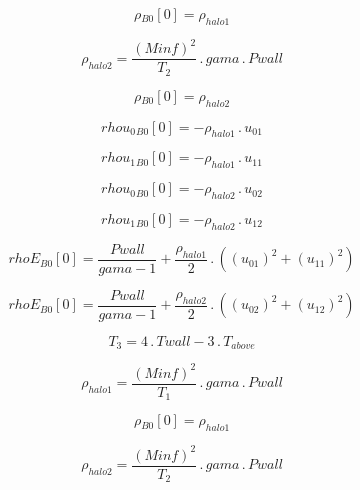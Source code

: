 \documentclass{article}
\begin{document}
\begin{dmath}{\rho{_{B0}}}[{0}] = \rho_{halo 1}\end{dmath}

\begin{dmath}\rho_{halo 2} = \frac{\left(Minf \right)^{2}}{T_{2}} \,.\, gama \,.\, Pwall\end{dmath}

\begin{dmath}{\rho{_{B0}}}[{0}] = \rho_{halo 2}\end{dmath}

\begin{dmath}{rhou_{0}{_{B0}}}[{0}] = - \rho_{halo 1} \,.\, u_{01}\end{dmath}

\begin{dmath}{rhou_{1}{_{B0}}}[{0}] = - \rho_{halo 1} \,.\, u_{11}\end{dmath}

\begin{dmath}{rhou_{0}{_{B0}}}[{0}] = - \rho_{halo 2} \,.\, u_{02}\end{dmath}

\begin{dmath}{rhou_{1}{_{B0}}}[{0}] = - \rho_{halo 2} \,.\, u_{12}\end{dmath}

\begin{dmath}{rhoE{_{B0}}}[{0}] = \frac{Pwall}{gama - 1} + \frac{\rho_{halo 1}}{2} \,.\, \left(\left(u_{01} \right)^{2} + \left(u_{11} \right)^{2}\right)\end{dmath}

\begin{dmath}{rhoE{_{B0}}}[{0}] = \frac{Pwall}{gama - 1} + \frac{\rho_{halo 2}}{2} \,.\, \left(\left(u_{02} \right)^{2} + \left(u_{12} \right)^{2}\right)\end{dmath}

\begin{dmath}T_{3} = 4 \,.\, Twall - 3 \,.\, T_{above}\end{dmath}

\begin{dmath}\rho_{halo 1} = \frac{\left(Minf \right)^{2}}{T_{1}} \,.\, gama \,.\, Pwall\end{dmath}

\begin{dmath}{\rho{_{B0}}}[{0}] = \rho_{halo 1}\end{dmath}

\begin{dmath}\rho_{halo 2} = \frac{\left(Minf \right)^{2}}{T_{2}} \,.\, gama \,.\, Pwall\end{dmath}
\end{document}

